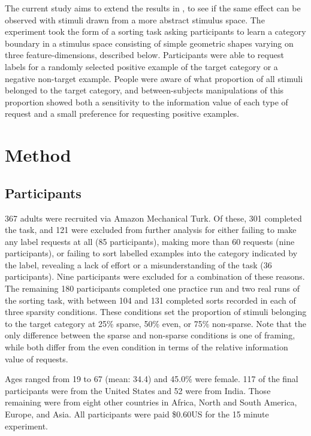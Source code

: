 \documentclass[10pt,letterpaper]{article}
\begin{document}
The current study aims to extend the results in , to see if the same effect can be observed with stimuli drawn from a more abstract stimulus space. The experiment took the form of a sorting task asking participants to learn a category boundary in a stimulus space consisting of simple geometric shapes varying on three feature-dimensions, described below. Participants were able to request labels for a randomly selected positive example of the target category or a negative non-target example. People were aware of what proportion of all stimuli belonged to the target category, and between-subjects manipulations of this proportion showed both a sensitivity to the information value of each type of request and a small preference for requesting positive examples.

\section*{Method}

\subsection{Participants}

367 adults were recruited via Amazon Mechanical Turk. Of these, 301 completed the task, and 121 were excluded from further analysis for either failing to make any label requests at all (85 participants), making more than 60 requests (nine participants), or failing to sort labelled examples into the category indicated by the label, revealing a lack of effort or a misunderstanding of the task (36 participants). Nine participants were excluded for a combination of these reasons.%
The remaining 180 participants completed one practice run and two real runs of the sorting task, with between 104 and 131 completed sorts recorded in each of three sparsity conditions. These conditions set the proportion of stimuli belonging to the target category at 25\% { \sc sparse}, 50\% { \sc even}, or 75\% { \sc non-sparse}. Note that the only difference between the { \sc sparse} and { \sc non-sparse} conditions is one of framing, while both differ from the even condition in terms of the relative information value of requests.

Ages ranged from 19 to 67 (mean: 34.4) and 45.0\% were female. 117 of the final participants were from the United States and 52 were from India. Those remaining were from eight other countries in Africa, North and South America, Europe, and Asia. All participants were paid \$0.60US for the 15 minute experiment.
\end{document}
